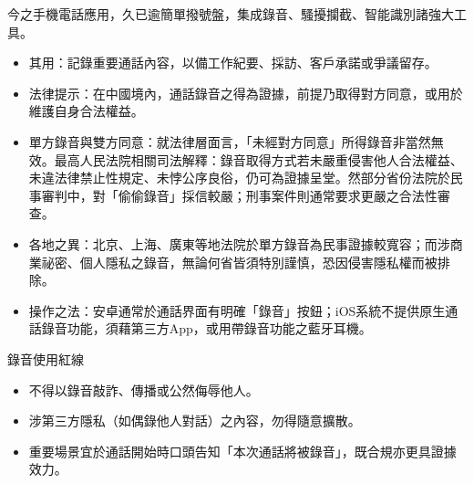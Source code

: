 


今之手機電話應用，久已逾簡單撥號盤，集成錄音、騷擾攔截、智能識別諸強大工具。


\begin{itemize}
  \item 其用：記錄重要通話內容，以備工作紀要、採訪、客戶承諾或爭議留存。
  \item 法律提示：在中國境內，通話錄音之得為證據，前提乃取得對方同意，或用於維護自身合法權益。
  \item 單方錄音與雙方同意：就法律層面言，「未經對方同意」所得錄音非當然無效。最高人民法院相關司法解釋：錄音取得方式若未嚴重侵害他人合法權益、未違法律禁止性規定、未悖公序良俗，仍可為證據呈堂。然部分省份法院於民事審判中，對「偷偷錄音」採信較嚴；刑事案件則通常要求更嚴之合法性審查。
  \item 各地之異：北京、上海、廣東等地法院於單方錄音為民事證據較寬容；而涉商業祕密、個人隱私之錄音，無論何省皆須特別謹慎，恐因侵害隱私權而被排除。
  \item 操作之法：安卓通常於通話界面有明確「錄音」按鈕；iOS系統不提供原生通話錄音功能，須藉第三方App，或用帶錄音功能之藍牙耳機。
\end{itemize}

\begin{tcbwarn}{錄音使用紅線}
\begin{itemize}
  \item 不得以錄音敲詐、傳播或公然侮辱他人。
  \item 涉第三方隱私（如偶錄他人對話）之內容，勿得隨意擴散。
  \item 重要場景宜於通話開始時口頭告知「本次通話將被錄音」，既合規亦更具證據效力。
\end{itemize}

\end{tcbwarn}


